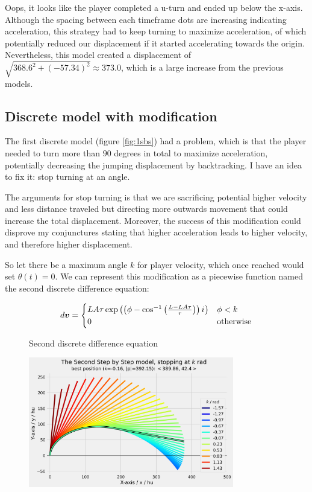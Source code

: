 Oops, it looks like the player completed a u-turn and ended up below the x-axis. Although the spacing between each timeframe dots are increasing indicating acceleration, this strategy had to keep turning to maximize acceleration, of which potentially reduced our displacement if it started accelerating towards the origin. Nevertheless, this model created a displacement of $\sqrt{368.6^2 + (-57.34)^2} \approx 373.0$, which is a large increase from the previous models.

\subsection{Discrete model with modification}
The first discrete model (figure \ref{fig:1sbs}) had a problem, which is that the player needed to turn more than $90$ degrees in total to maximize acceleration, potentially decreasing the jumping displacement by backtracking. I have an idea to fix it: stop turning at an angle.

The arguments for stop turning is that we are sacrificing potential higher velocity and less distance traveled but directing more outwards movement that could increase the total displacement. Moreover, the success of this modification could disprove my conjunctures stating that higher acceleration leads to higher velocity, and therefore higher displacement.

So let there be a maximum angle $k$ for player velocity, which once reached would set $\theta(t) = 0$. We can represent this modification as a piecewise function named the second discrete difference equation:

\begin{figure}[H]
    \centering
    \[
        d\boldsymbol{v} = \begin{cases}
            LA\tau \exp\left(\left(\phi - \cos^{-1}\left(\frac{L-LA\tau}{r}\right)\right) {i\mkern1mu}\right) & \phi < k\\
            0 & \text{otherwise}
        \end{cases}
    \]
    \caption{Second discrete difference equation}
    \label{fig:ssbs}
\end{figure}



\begin{figure}[H]
    \centering
    \includegraphics[width=0.8\textwidth]{assets/step_by_step_2.png}
    \caption{}
    \label{fig:sbs2}
\end{figure}

